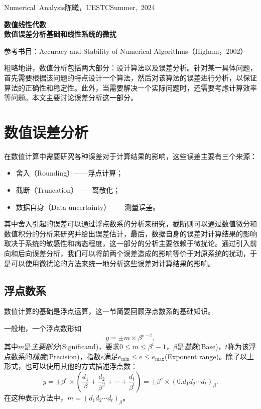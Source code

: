 \documentclass[a4paper,10pt]{ctexart}
\begin{document}
\hfill\vbox{\hbox{Numerical Analysis}\hbox{陈曦，UESTC}\hbox{Summer, 2024}}

\begin{center}\Large
    \textbf{数值线性代数}\\{\normalsize\bf {数值误差分析基础和线性系统的微扰}}
\end{center}
\vskip 30pt
\begin{center}
    \small {参考书目：Accuracy and Stability of Numerical Algorithms（Higham，2002）}
\end{center}

粗略地讲，数值分析包括两大部分：设计算法以及误差分析。针对某一具体问题，首先需要根据该问题的特点设计一个算法，然后对该算法的误差进行分析，以保证算法的正确性和稳定性。此外，当需要解决一个实际问题时，还需要考虑计算效率等问题。本文主要讨论误差分析这一部分。

\section{数值误差分析}
在数值计算中需要研究各种误差对于计算结果的影响，这些误差主要有三个来源：
\begin{itemize}
    \item 舍入（Rounding）——浮点计算；
    \item 截断（Truncation）——离散化；
    \item 数据自身（Data uncertainty）——测量误差。
\end{itemize}
其中舍入引起的误差可以通过浮点数系的分析来研究，截断则可以通过数值微分和数值积分的分析来研究并给出误差估计，最后，数据自身的误差对计算结果的影响取决于系统的敏感性和病态程度，这一部分的分析主要依赖于微扰论。通过引入前向和后向误差分析，我们可以将前两个误差造成的影响等价于对原系统的扰动，于是可以使用微扰论的方法来统一地分析这些误差对计算结果的影响。

\subsection{浮点数系}
数值计算的基础是浮点运算，这一节简要回顾浮点数系的基础知识。

一般地，一个浮点数形如
\begin{equation}
    y = \pm m\times \beta^{e-t},
\end{equation}
其中$ m $是\emph{主要部分}(Significand)，要求$ 0\leqslant m\leqslant \beta^t-1 $，$ \beta $是\emph{基数}(Base)，$ t $称为该浮点数系的\emph{精度}(Precision)，指数$ e $满足$ e_{\min}\leqslant e\leqslant e_{\max} $(Exponent range)。除了以上形式，也可以使用其他的方式描述浮点数：
\begin{equation}
    y = \pm \beta^e\times \left( \frac{d_1}{\beta} + \frac{d_2}{\beta^2} + \cdots + \frac{d_t}{\beta^t} \right) = \pm \beta^e\times (0.d_1d_2\cdots d_t)_\beta.
\end{equation}
在这种表示方法中，$ m = (d_1d_2\cdots d_t)_\beta $。
\end{document}
